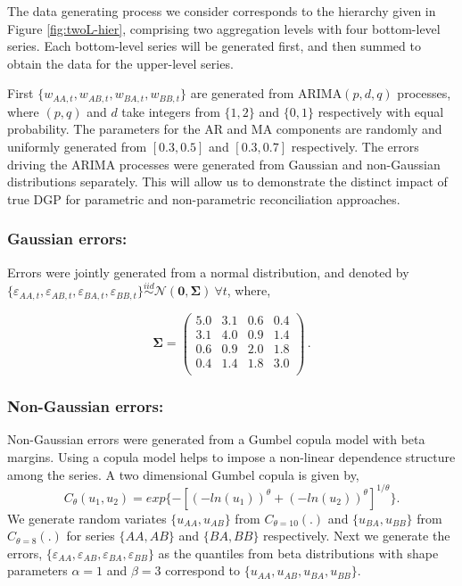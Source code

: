 \documentclass[12pt]{article}
\theoremstyle{definition}
\begin{document}
The data generating process we consider corresponds to the hierarchy given in Figure \ref{fig:twoL-hier}, comprising two aggregation levels with four bottom-level series. Each bottom-level series will be generated first, and then summed to obtain the data for the upper-level series.

First $\{w_{AA,t},w_{AB,t},w_{BA,t},w_{BB,t}\}$ are generated from ARIMA$(p,d,q)$ processes, where $(p,q)$ and $d$ take integers from $\{1,2\}$ and $\{0,1\}$ respectively with equal probability. The parameters for the AR and MA components are randomly and uniformly generated from $[0.3,0.5]$ and $[0.3,0.7]$ respectively.
The errors driving the ARIMA processes were generated from Gaussian and non-Gaussian distributions separately. This will allow us to demonstrate the distinct impact of true DGP for parametric and non-parametric reconciliation approaches.


\subsubsection*{Gaussian errors:}

Errors were jointly generated from a normal distribution, and denoted by $\{\varepsilon_{AA,t},\varepsilon_{AB,t},\varepsilon_{BA,t},\varepsilon_{BB,t}\} \overset{iid}{\sim} \mathcal{N}(\bm{0}, \bm{\Sigma})~\forall t$, where,


\begin{equation}\label{eq:SigmaGaussian}
\bm{\Sigma} =
\begin{pmatrix}
5.0 & 3.1 & 0.6 & 0.4 \\
3.1 & 4.0 & 0.9 & 1.4 \\
0.6 & 0.9 & 2.0 & 1.8 \\
0.4 & 1.4 & 1.8 & 3.0 \\
\end{pmatrix}\,.
\end{equation}


\subsubsection*{Non-Gaussian errors:}

Non-Gaussian errors were generated from a Gumbel copula model with beta margins. Using a copula model helps to impose a non-linear dependence structure among the series. A two dimensional Gumbel copula is given by,
\begin{equation*}
C_\theta(u_1, u_2) = exp\{-[(-ln(u_1))^\theta + (-ln(u_2))^\theta]^{1/\theta}\}.
\end{equation*}
We generate random variates $\{u_{AA}, u_{AB}\}$ from $C_{\theta=10}(.)$ and $\{u_{BA}, u_{BB}\}$ from $C_{\theta=8}(.)$ for series $\{AA, AB\}$ and $\{BA, BB\}$ respectively. Next we generate the errors, $\{\varepsilon_{AA}, \varepsilon_{AB}, \varepsilon_{BA}, \varepsilon_{BB}\}$ as the quantiles from beta distributions with shape parameters $\alpha = 1$ and $\beta = 3$ correspond to $\{u_{AA}, u_{AB}, u_{BA}, u_{BB}\}$.
\end{document}
